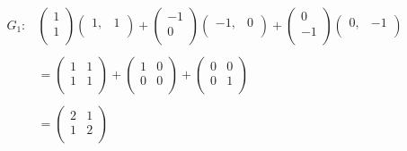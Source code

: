 \documentclass[11pt,a4paper]{article}
\theoremstyle{definition}
\begin{document}
\begin{align*}
G_1: & \begin{pmatrix}
1\\ 1\\
\end{pmatrix}
\begin{pmatrix}
1, & 1\\
\end{pmatrix} + \begin{pmatrix}
-1\\ 0\\
\end{pmatrix}
\begin{pmatrix}
-1, & 0\\
\end{pmatrix} + \begin{pmatrix}
0\\ -1\\
\end{pmatrix}
\begin{pmatrix}
0, & -1\\
\end{pmatrix}\\\\
& = 
\begin{pmatrix}
1 & 1\\
1 & 1\\
\end{pmatrix} + \begin{pmatrix}
1 & 0\\
0 & 0\\
\end{pmatrix} + \begin{pmatrix}
0 & 0\\
0 & 1\\
\end{pmatrix}\\\\
& = \begin{pmatrix}
2 & 1\\
1 & 2\\
\end{pmatrix}\\
\end{align*}
\end{document}
